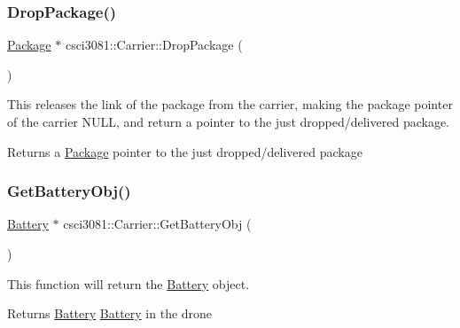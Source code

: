 \subsubsection{\texorpdfstring{Drop\+Package()}{DropPackage()}}
{\footnotesize\ttfamily \hyperlink{classcsci3081_1_1Package}{Package} $\ast$ csci3081\+::\+Carrier\+::\+Drop\+Package (\begin{DoxyParamCaption}{ }\end{DoxyParamCaption})}



This releases the link of the package from the carrier, making the package pointer of the carrier N\+U\+LL, and return a pointer to the just dropped/delivered package. 

\begin{DoxyReturn}{Returns}
a \hyperlink{classcsci3081_1_1Package}{Package} pointer to the just dropped/delivered package 
\end{DoxyReturn}
\mbox{\label{classcsci3081_1_1Carrier_a0d871b65140eefec69158b14703d92bc}} 
\subsubsection{\texorpdfstring{Get\+Battery\+Obj()}{GetBatteryObj()}}
{\footnotesize\ttfamily \hyperlink{classcsci3081_1_1Battery}{Battery} $\ast$ csci3081\+::\+Carrier\+::\+Get\+Battery\+Obj (\begin{DoxyParamCaption}{ }\end{DoxyParamCaption})}



This function will return the \hyperlink{classcsci3081_1_1Battery}{Battery} object. 

\begin{DoxyReturn}{Returns}
\hyperlink{classcsci3081_1_1Battery}{Battery} \hyperlink{classcsci3081_1_1Battery}{Battery} in the drone 
\end{DoxyReturn}
\mbox{\label{classcsci3081_1_1Carrier_a25d1396e9c91e9574ab752eaf0b24048}} 
